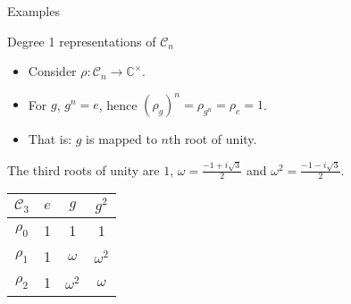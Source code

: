 \documentclass[10pt]{beamer}
\newcommand{\Cyc}{\mathcal{C}}
\newcommand{\CC}{\mathbb{C}}
\begin{document}
	\begin{frame}{Examples}
%				
%		
		\begin{block}{Degree 1 representations of $\Cyc_n$}
			\begin{itemize}
				\item Consider $\rho: \Cyc_n \rightarrow \CC^\times$.
				
				\item For $g$, $g^n = e$, hence $(\rho_g)^n = \rho_{g^n} = \rho_e = 1$.
				
				\item That is: $g$ is mapped to $n$th root of unity.
			\end{itemize}
		\end{block}\pause
		
		\begin{example}[$\Cyc_3$]
			The third roots of unity are $1$, $\omega = \frac{-1+i\sqrt{3}}{2}$ and $\omega^2 = \frac{-1-i\sqrt{3}}{2}$.
			\begin{table}
				\centering
				\begin{tabular}{c | c c c}
					$\Cyc_3$ & $e$ & $g$        & $g^2$      \\ \hline
					$\rho_0$          & 1   & 1          & 1          \\
					$\rho_1$          & 1   & $\omega$   & $\omega^2$ \\
					$\rho_2$          & 1   & $\omega^2$ & $\omega$
				\end{tabular}
			\end{table}
		\end{example}
		
		

\end{frame}
\end{document}
